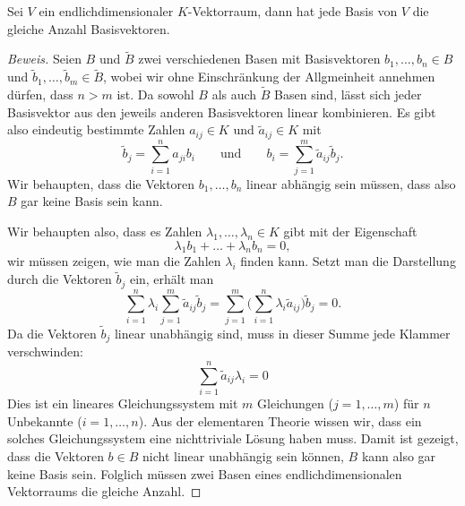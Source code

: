 \begin{lemma}
Sei $V$ ein endlichdimensionaler $K$-Vektorraum, dann hat jede Basis
von $V$ die gleiche Anzahl Basisvektoren.
\end{lemma}

\begin{proof}[Beweis]
Seien $B$ und $\tilde B$ zwei verschiedenen Basen mit Basisvektoren
$b_1,\dots,b_n\in B$ und $\tilde b_1,\dots,\tilde b_m\in \tilde B$,
wobei wir ohne Einschränkung der Allgmeinheit annehmen dürfen, dass $n>m$
ist.
Da sowohl $B$ als auch $\tilde B$ Basen sind, lässt sich jeder Basisvektor
aus den jeweils anderen Basisvektoren linear kombinieren.
Es gibt also eindeutig bestimmte Zahlen $a_{ij}\in K$ und
$\tilde a_{ij}\in K$ mit
\[
\tilde b_j = \sum_{i=1}^n a_{ji} b_i
\qquad\text{und}\qquad
b_i = \sum_{j=1}^m \tilde a_{ij}\tilde b_j.
\]
Wir behaupten, dass die Vektoren $b_1,\dots,b_n$ linear abhängig sein 
müssen, dass also $B$ gar keine Basis sein kann.

Wir behaupten also, dass es Zahlen $\lambda_1,\dots,\lambda_n\in K$
gibt mit der Eigenschaft
\[
\lambda_1 b_1+\dots+\lambda_n b_n = 0,
\]
wir müssen zeigen, wie man die Zahlen $\lambda_i$ finden kann.
Setzt man die Darstellung durch die Vektoren $\tilde b_j$ ein, erhält man
\[
\sum_{i=1}^n
\lambda_i
\sum_{j=1}^m
\tilde a_{ij}\tilde b_j
=
\sum_{j=1}^m
\biggl(
\sum_{i=1}^n
\lambda_i
\tilde a_{ij}
\biggr)
\tilde b_j
=
0.
\]
Da die Vektoren $\tilde b_j$ linear unabhängig sind, muss in dieser
Summe jede Klammer verschwinden:
\[
\sum_{i=1}^n \tilde a_{ij}\lambda_i =0 
\]
Dies ist ein lineares Gleichungssystem mit $m$ Gleichungen ($j=1,\dots,m$)
für $n$ Unbekannte ($i=1,\dots,n$).
Aus der elementaren Theorie wissen wir, dass ein solches Gleichungssystem
eine nichttriviale Lösung haben muss.
Damit ist gezeigt, dass die Vektoren $b\in B$ nicht linear unabhängig sein
können, $B$ kann also gar keine Basis sein.
Folglich müssen zwei Basen eines endlichdimensionalen Vektorraums
die gleiche Anzahl.
\end{proof}

